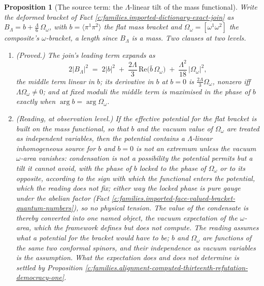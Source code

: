 \documentclass[11pt]{article}
\newtheorem{proposition}[theorem]{Proposition}
\theoremstyle{definition}
\theoremstyle{plain}
\newcommand{\changedmark}[2]{\marginpar{\raggedright\scriptsize\color{#1}#2}}
\providecommand{\br}{}\renewcommand{\br}[1]{\langle #1\rangle}
\begin{document}
\begin{proposition}[The source term: the $\Lambda$-linear tilt of the mass functional]\label{c:families.source-term-linear-tilt-mass-functional}
\changedmark{gray}{reworded}
Write the deformed bracket of Fact \ref{c:families.imported-dictionary-exact-join} as $B_{\Lambda} = b + \tfrac{\Lambda}{6}\,\Omega_{\omega}$, with $b = \br{\pi^{1}\pi^{2}}$ the flat mass bracket and $\Omega_{\omega} = [\omega^{1}\omega^{2}]$ the composite's $\omega$-bracket, a length since $B_{\Lambda}$ is a mass. Two clauses at two levels.
\begin{enumerate}
\item \emph{(Proved.)} The join's leading term expands as
\begin{equation}
2|B_{\Lambda}|^{2} \;=\; 2|b|^{2} \;+\; \frac{2\Lambda}{3}\,\mathrm{Re}\bigl(\bar{b}\,\Omega_{\omega}\bigr) \;+\; \frac{\Lambda^{2}}{18}\,|\Omega_{\omega}|^{2},
\end{equation}
the middle term linear in $b$; its derivative in $b$ at $b = 0$ is $\tfrac{2\Lambda}{3}\Omega_{\omega}$, nonzero iff $\Lambda\Omega_{\omega} \ne 0$; and at fixed moduli the middle term is maximised in the phase of $b$ exactly when $\arg b = \arg\Omega_{\omega}$.
\item \emph{(Reading, at observation level.)} If the effective potential for the flat bracket is built on the mass functional, so that $b$ and the vacuum value of $\Omega_{\omega}$ are treated as independent variables, then the potential contains a $\Lambda$-linear inhomogeneous source for $b$ and $b = 0$ is not an extremum unless the vacuum $\omega$-area vanishes: condensation is not a possibility the potential permits but a tilt it cannot avoid, with the phase of $b$ locked to the phase of $\Omega_{\omega}$ or to its opposite, according to the sign with which the functional enters the potential, which the reading does not fix; either way the locked phase is pure gauge under the abelian factor (Fact \ref{c:families.imported-face-valued-bracket-quantum-numbers}), so no physical tension. The value of the condensate is thereby converted into one named object, the vacuum expectation of the $\omega$-area, which the framework defines but does not compute. The reading assumes what a potential for the bracket would have to be; $b$ and $\Omega_{\omega}$ are functions of the same two conformal spinors, and their independence as vacuum variables is the assumption. What the expectation does and does not determine is settled by Proposition \ref{c:families.alignment-computed-thirteenth-refutation-democracy-one}.
\end{enumerate}
\end{proposition}
\end{document}
